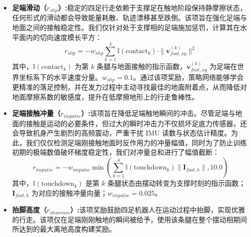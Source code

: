 \begin{itemize}
          \begin{equation}
              I_{total} = \sum_{b \notin \text{feet}} \| \mathbf{I}_b \| + \sum_{f \in \text{feet}} \mathbb{I}(\theta_f < 0.05\pi) \cdot \| \mathbf{I}_{f, xy} \|
          \end{equation}
          \begin{equation}
              r_{collision} = - w_{coll} \cdot \min(I_{total}, 10.0)
          \end{equation}
          其中，$\mathbf{I}_b$ 为非足部刚体的接触冲量向量，$\mathbf{I}_{f, xy}$ 为足端冲量的水平分量，$\theta_f$ 为足端接触力矢量与水平面的夹角。通过限制 $I_{total}$ 的最大值为 $10.0$，我们确保了惩罚信号的有界性。$w_{coll}=0.3$。
    \item \textbf{足端滑动（$r_{slip}$）:}稳定的四足行走依赖于支撑足在触地阶段保持静摩擦状态，任何形式的滑动都会导致能量耗散、轨迹漂移甚至跌倒。该项旨在强化足端与地面之间的接触稳定性。我们仅针对处于支撑相的足端施加惩罚，计算其在水平面内的切向速度模长平方：
          \begin{equation}
              r_{slip} = - w_{slip} \sum_{k=1}^{4} \mathbb{I}(\text{contact}_k) \cdot \| \mathbf{v}_{foot, xy}^{(k)} \|^2
          \end{equation}
          其中，$\mathbb{I}(\text{contact}_k)$ 为第 $k$ 条腿与地面接触的指示函数，$\mathbf{v}_{foot, xy}^{(k)}$ 为足端在世界坐标系下的水平速度分量。$w_{slip}=0.1$。通过该项奖励，策略网络能够学会更精准的落足控制，并在发力过程中主动寻找最佳的地面附着点，从而降低对地面摩擦系数的敏感度，提升在低摩擦地形上的行走鲁棒性。
    \item \textbf{足端接触冲量（$r_{impulse}$）:}该项旨在降低足端触地瞬间的冲击。尽管足端与地面的接触是运动的必要条件，但过大的瞬时冲击力不仅损坏足底力传感器，还会导致机身产生剧烈的高频震动，严重干扰 IMU 读数与状态估计精度。为此，我们仅仅检测足端刚接触地面时反作用力的冲量幅值，同时为了防止训练初期的极端数值破坏梯度稳定性，我们对冲量总和进行了幅值截断：
          \begin{equation}
              r_{impulse} = - w_{impulse} \min\left(\sum_{k=1}^{4}\mathbb{I}(\text{touchdown}_k) \| \mathbf{I}_{foot, k} \|, 10.0\right)
          \end{equation}
          其中，$\mathbb{I}(\text{touchdown}_k)$ 是第 $k$ 条腿状态由摆动转变为支撑时刻的指示函数；$\mathbf{I}_{foot, k}$ 为对应的接触冲量向量；$w_{impulse}=0.025$。
    \item \textbf{抬脚高度（$r_{clearence}$）:}该项奖励鼓励四足机器人在运动过程中抬脚，实现优雅的行走。该项仅在足端刚刚触地的瞬间被给予，使用该条腿在整个摆动相期间所达到的最大离地高度构建奖励。

\end{itemize}
